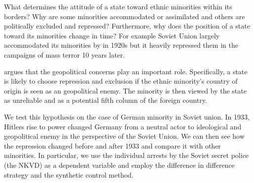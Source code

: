 What determines the attitude of a state toward ethnic minorities within
its borders? Why are some minorities accommodated or assimilated and
others are politically excluded and repressed? Furthermore,  why does the
position of a state toward its minorities change in time? For example
Soviet Union largely accommodated its minorities by in 1920s but it
heavily repressed them in the campaigns of  mass terror 10 years later. 

\citet{mylonas_politics_2013} argues that the geopolitical concerns play an important role. Specifically, a state is likely to choose repression and
exclusion if the ethnic minority's country of origin is seen as an
geopolitical enemy. The minority is then viewed by the state as
unreliable and as a potential fifth column of the foreign country.   

We test this hypothesis on the case of German minority in Soviet union.
In 1933, Hitlers rise to power changed Germany from a neutral actor to ideological and geopolitical enemy in the perspective of the Soviet Union. We can then see how the repression changed before and after 1933 and compare it with other minorities. In particular, we use the individual arrests by the Soviet secret police (the NKVD) as a dependent variable and employ the difference in difference strategy and the synthetic control method. 





